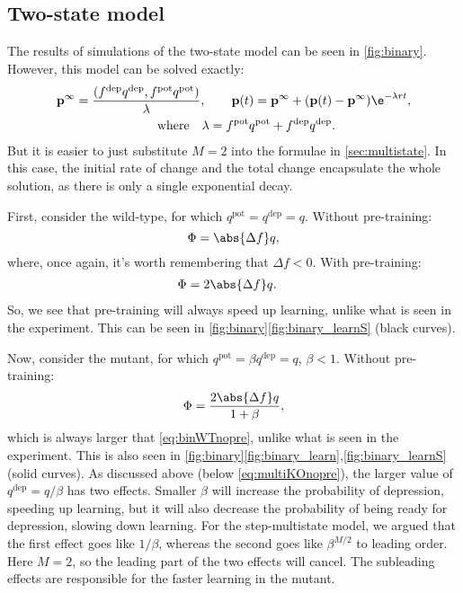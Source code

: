 \documentclass[12pt]{article}
\newcommand{\pr}{\mathbf{p}}
\newcommand{\eq}{\pr^\infty}
\newcommand{\pot}{^{\text{pot}}}
\newcommand{\dep}{^{\text{dep}}}
\begin{document}
\subsection{Two-state model}\label{sec:binary}




The results of simulations of the two-state model can be seen in \autoref{fig:binary}.
However, this model can be solved exactly:
%
\begin{multline}\label{eq:binarysol}
  \eq = \frac{(f\dep q\dep, f\pot q\pot)}{\lambda},
  \qquad
  \pr(t) = \eq + (\pr(t)-\eq)\e^{-\lambda rt},\\
  \qquad \text{where} \quad
  \lambda = f\pot q\pot + f\dep q\dep.
\end{multline}
%
But it is easier to just substitute $M=2$ into the formulae in \autoref{sec:multistate}.
In this case, the initial rate of change and the total change encapsulate the whole solution, as there is only a single exponential decay.

First, consider the wild-type, for which $q\pot=q\dep=q$.
Without pre-training:
%
\begin{equation}\label{eq:binWTnopre}
  \Phi = \abs{\Delta f} q,
\end{equation}
%
where, once again, it's worth remembering that $\Delta f<0$.
With pre-training:
%
\begin{equation}\label{eq:binWTpre}
\begin{aligned}
  \Phi &= 2\abs{\Delta f} q.
\end{aligned}
\end{equation}
%
So, we see that pre-training will always speed up learning, unlike what is seen in the experiment.
This can be seen in \autoref{fig:binary}\ref{fig:binary_learnS} (black curves).

Now, consider the mutant, for which $q\pot=\beta q\dep=q$, $\beta<1$.
Without pre-training:
%
\begin{equation}\label{eq:binKOnopre}
  \Phi = \frac{2\abs{\Delta f} q}{1+\beta},
\end{equation}
%
which is always larger that \eqref{eq:binWTnopre}, unlike what is seen in the experiment.
This is also seen in \autoref{fig:binary}\ref{fig:binary_learn},\ref{fig:binary_learnS} (solid curves).
As discussed above (below \eqref{eq:multiKOnopre}), the larger value of $q\dep=q/\beta$ has two effects.
Smaller $\beta$ will increase the probability of depression, speeding up learning, but it will also decrease the probability of being ready for depression, slowing down learning.
For the step-multistate model, we argued that the first effect goes like $1/\beta$, whereas the second goes like $\beta^{M/2}$ to leading order.
Here $M=2$, so the leading part of the two effects will cancel.
The subleading effects are responsible for the faster learning in the mutant.
\end{document}
